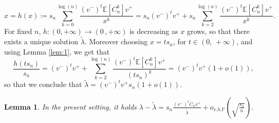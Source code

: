 \documentclass[11pt,oneside]{amsart}
\theoremstyle{plain}
\newtheorem{lemma}[theorem]{Lemma}
\numberwithin{equation}{section}
\newcommand{\E}{\mathbb{E}}
\newcommand{\p}{\mathbb{P}}
\newcommand{\centered}{C_n}
\newcommand{\x}{{{v}}^+}
\newcommand{\y}{{{v}}^-}
\newcommand{\scaling}{s_n}
\newcommand{\ohp}{o_{v.h.\p}}
\begin{document}
\begin{equation} \label{eq:fixed-point}
    x = h(x)\coloneq\scaling \sum_{k=0}^{\log(n)}  \frac{(v^-)^t {\E[C^k_n]} v^+}{x^k}
    = \scaling(v^-)^t  v^+ +  \scaling\sum_{k=2}^{\log(n)}  \frac{(v^-)^t {\E[C^k_n]} v^+}{x^k}.
\end{equation}
For fixed $n$, $h:(0,+\infty)\to (0\, , +\infty)$ is decreasing as $x$ grows, so that there exists a unique solution $\tilde \lambda$. Moreover choosing $x= t \scaling$, for $t \in (0,\, +\infty)$, and using Lemma \ref{lem:1}, we get that
\begin{equation}
    \frac{h(t\scaling)}{\scaling} =(\y)^t\x+  \sum_{k=2}^{\log(n)}  \frac{(v^-)^t {\E[C^k_n]} v^+}{(t\scaling)^k} =(\y)^t\x (1+o(1)),
\end{equation}
so that we conclude that $\tilde{\lambda}=(\y)^t\x\scaling(1+o(1))$.

\begin{lemma} \label{lem:fixed-point}
   In the present setting, it holds
        $\lambda -\tilde{\lambda}=\scaling\frac{(v^-)^t \centered v^+}{\tilde\lambda}+\ohp\left(\sqrt{\frac{\scaling}{n}}\right).$
\end{lemma}
\end{document}
